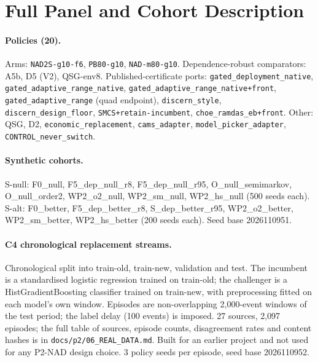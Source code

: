 \section{Full Panel and Cohort Description}\label{app:panel}

\paragraph{Policies (20).} Arms: \texttt{NAD2S-g10-f6}, \texttt{PB80-g10}, \texttt{NAD-m80-g10}.
Dependence-robust comparators: A5b, D5 (V2), QSG-env8. Published-certificate ports:
\texttt{gated\_deployment\_native}, \texttt{gated\_adaptive\_range\_native},
\texttt{gated\_adaptive\_range\_native+front}, \texttt{gated\_adaptive\_range} (quad endpoint),
\texttt{discern\_style}, \texttt{discern\_design\_floor}, \texttt{SMCS+retain-incumbent},
\texttt{choe\_ramdas\_eb+front}. Other: QSG, D2, \texttt{economic\_replacement}, \texttt{cams\_adapter},
\texttt{model\_picker\_adapter}, \texttt{CONTROL\_never\_switch}.

\paragraph{Synthetic cohorts.} S-null: F0\_null, F5\_dep\_null\_r8, F5\_dep\_null\_r95,
O\_null\_semimarkov, O\_null\_order2, WP2\_o2\_null, WP2\_sm\_null, WP2\_hs\_null (500 seeds each).
S-alt: F0\_better, F5\_dep\_better\_r8, S\_dep\_better\_r95, WP2\_o2\_better, WP2\_sm\_better,
WP2\_hs\_better (200 seeds each). Seed base 2026110951.

\paragraph{C4 chronological replacement streams.} Chronological split into train-old, train-new,
validation and test. The incumbent is a standardised logistic regression trained on train-old; the
challenger is a HistGradientBoosting classifier trained on train-new, with preprocessing fitted on
each model's own window. Episodes are non-overlapping 2{,}000-event windows of the test period; the
label delay (100 events) is imposed. 27 sources, 2{,}097 episodes; the full table of sources,
episode counts, disagreement rates and content hashes is in \texttt{docs/p2/06\_REAL\_DATA.md}.
Built for an earlier project and not used for any P2-NAD design choice. 3 policy seeds per episode,
seed base 2026110952.

